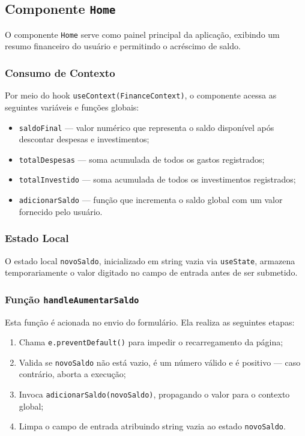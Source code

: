 \documentclass{article}
\begin{document}
\subsection{Componente \texttt{Home}}

O componente \texttt{Home} serve como painel principal da aplicação, exibindo um resumo financeiro do usuário e permitindo o acréscimo de saldo.

\subsubsection*{Consumo de Contexto}

Por meio do hook \texttt{useContext(FinanceContext)}, o componente acessa as seguintes variáveis e funções globais:

\begin{itemize}
  \item \texttt{saldoFinal} — valor numérico que representa o saldo disponível após descontar despesas e investimentos;
  \item \texttt{totalDespesas} — soma acumulada de todos os gastos registrados;
  \item \texttt{totalInvestido} — soma acumulada de todos os investimentos registrados;
  \item \texttt{adicionarSaldo} — função que incrementa o saldo global com um valor fornecido pelo usuário.
\end{itemize}

\subsubsection*{Estado Local}

O estado local \texttt{novoSaldo}, inicializado em string vazia via \texttt{useState}, armazena temporariamente o valor digitado no campo de entrada antes de ser submetido.

\subsubsection*{Função \texttt{handleAumentarSaldo}}

Esta função é acionada no envio do formulário. Ela realiza as seguintes etapas:

\begin{enumerate}
  \item Chama \texttt{e.preventDefault()} para impedir o recarregamento da página;
  \item Valida se \texttt{novoSaldo} não está vazio, é um número válido e é positivo — caso contrário, aborta a execução;
  \item Invoca \texttt{adicionarSaldo(novoSaldo)}, propagando o valor para o contexto global;
  \item Limpa o campo de entrada atribuindo string vazia ao estado \texttt{novoSaldo}.
\end{enumerate}
\end{document}
